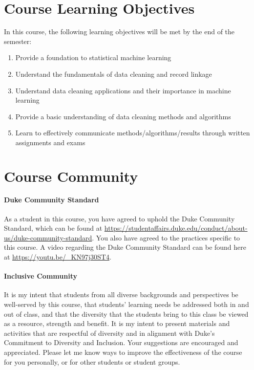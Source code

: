 \documentclass[11pt]{article}
\begin{document}
\section{Course Learning Objectives}
In this course, the following learning objectives will be met by the end of the semester:\\
\begin{enumerate}
\item Provide a foundation to statistical machine learning
\item Understand the fundamentals of data cleaning and record linkage 
\item Understand data cleaning applications and their importance in machine learning 
\item Provide a basic understanding of data cleaning methods and algorithms
\item Learn to effectively communicate methods/algorithms/results through written assignments and exams 
\end{enumerate}

\section{Course Community}



\paragraph{Duke Community Standard} 
As a student in this course, you have agreed to uphold the Duke Community Standard, which can be found at \url{https://studentaffairs.duke.edu/conduct/about-us/duke-community-standard}. You also have agreed to the practices specific to this course.  A video regarding the Duke Community Standard can be found here at \url{https://youtu.be/_KN97j30ST4}. 


\paragraph{Inclusive Community}

It is my intent that students from all diverse backgrounds and perspectives be well-served by this course, that students’ learning needs be addressed both in and out of class, and that the diversity that the students bring to this class be viewed as a resource, strength and benefit. It is my intent to present materials and activities that are respectful of diversity and in alignment with Duke’s Commitment to Diversity and Inclusion. Your suggestions are encouraged and appreciated. Please let me know ways to improve the effectiveness of the course for you personally, or for other students or student groups. \\
\end{document}
